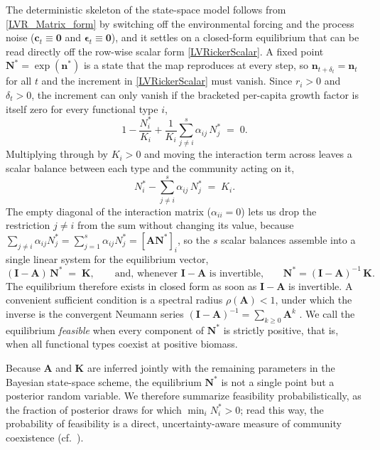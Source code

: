 \documentclass[12pt]{article}
\begin{document}
The deterministic skeleton of the state-space model follows from \eqref{LVR_Matrix_form} by switching off the environmental forcing and the process noise ($\mathbf{c}_{t}\equiv\mathbf{0}$ and $\boldsymbol{\epsilon}_{t}\equiv\mathbf{0}$), and it settles on a closed-form equilibrium that can be read directly off the row-wise scalar form \eqref{LVRickerScalar}. A fixed point $\mathbf{N}^{*}=\exp(\mathbf{n}^{*})$ is a state that the map reproduces at every step, so $\mathbf{n}_{t+\delta_{t}}=\mathbf{n}_{t}$ for all $t$ and the increment in \eqref{LVRickerScalar} must vanish. Since $r_{i}>0$ and $\delta_{t}>0$, the increment can only vanish if the bracketed per-capita growth factor is itself zero for every functional type $i$,
\begin{equation*}
	1 - \frac{N_{i}^{*}}{K_{i}} + \frac{1}{K_{i}}\sum_{j\neq i}^{s}\alpha_{ij}\,N_{j}^{*} \;=\; 0.
\end{equation*}
Multiplying through by $K_{i}>0$ and moving the interaction term across leaves a scalar balance between each type and the community acting on it,
\begin{equation*}
	N_{i}^{*} - \sum_{j\neq i}^{s}\alpha_{ij}\,N_{j}^{*} \;=\; K_{i}.
\end{equation*}
The empty diagonal of the interaction matrix ($\alpha_{ii}=0$) lets us drop the restriction $j\neq i$ from the sum without changing its value, because $\sum_{j\neq i}\alpha_{ij}N_{j}^{*}=\sum_{j=1}^{s}\alpha_{ij}N_{j}^{*}=[\mathbf{A}\mathbf{N}^{*}]_{i}$, so the $s$ scalar balances assemble into a single linear system for the equilibrium vector,
\begin{equation}\label{LVR_Equilibria}
	(\mathbf{I}-\mathbf{A})\,\mathbf{N}^{*} \;=\; \mathbf{K}, \qquad \text{and, whenever $\mathbf{I}-\mathbf{A}$ is invertible,}\qquad \mathbf{N}^{*}=(\mathbf{I}-\mathbf{A})^{-1}\,\mathbf{K}.
\end{equation}
The equilibrium therefore exists in closed form as soon as $\mathbf{I}-\mathbf{A}$ is invertible. A convenient sufficient condition is a spectral radius $\rho(\mathbf{A})<1$, under which the inverse is the convergent Neumann series $(\mathbf{I}-\mathbf{A})^{-1}=\sum_{k\geq 0}\mathbf{A}^{k}$ \citep{Takeuchi1996,Elaydi2005}. We call the equilibrium \emph{feasible} when every component of $\mathbf{N}^{*}$ is strictly positive, that is, when all functional types coexist at positive biomass.

Because $\mathbf{A}$ and $\mathbf{K}$ are inferred jointly with the remaining parameters in the Bayesian state-space scheme, the equilibrium $\mathbf{N}^{*}$ is not a single point but a posterior random variable. We therefore summarize feasibility probabilistically, as the fraction of posterior draws for which $\min_{i}N_{i}^{*}>0$; read this way, the probability of feasibility is a direct, uncertainty-aware measure of community coexistence (cf.\ \citealp{Roberts1974,Almaraz2024}).
\end{document}
